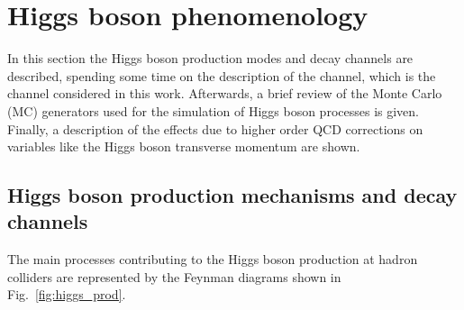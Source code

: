 \section{Higgs boson phenomenology}
\label{sec:HiggsPheno}

In this section the Higgs boson production modes and decay channels are described, spending some time on the description of the \hww channel, which is the channel considered in this work. Afterwards, a brief review of the Monte Carlo (MC) generators used for the simulation of Higgs boson processes is given. Finally, a description of the effects due to higher order QCD corrections on variables like the Higgs boson transverse momentum are shown.


\subsection{Higgs boson production mechanisms and decay channels}

The main processes contributing to the Higgs boson production at hadron colliders are represented by the Feynman diagrams shown in Fig.~\ref{fig:higgs_prod}.

